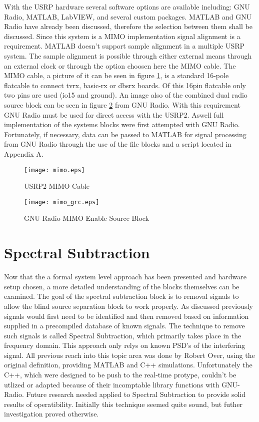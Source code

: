 With the USRP hardware several software options are available including: GNU Radio, MATLAB, LabVIEW, and several custom packages.  MATLAB and GNU Radio have already been discussed, therefore the selection between them shall be discussed.  Since this system is a MIMO implementation signal alignment is a requirement.  MATLAB doesn't support sample alignment in a multiple USRP system.  The sample alignment is possible through either external means through an external clock or through the option choosen here the MIMO cable.  The MIMO cable, a picture of it can be seen in figure \ref{mimo}, is a standard 16-pole flatcable to connect tvrx, basic-rx or dbsrx boards.  Of this 16pin flatcable only two pins are used (io15 and ground)\cite{mimo_cable}.  An image also of the combined dual radio source block can be seen in figure \ref{mimo_grc} from GNU Radio.  With this requirement GNU Radio must be used for direct access with the USRP2.  Aswell full implementation of the systems blocks were first attempted with GNU Radio.  Fortunately, if necessary, data can be passed to MATLAB for signal processing from GNU Radio through the use of the file blocks and a script located in Appendix A.\\

\begin{figure}[!ht]\label{mimo}
\centering
\texttt{[image: mimo.eps]}%
\caption{USRP2 MIMO Cable}
\end{figure} 

\begin{figure}[!ht]\label{mimo_grc}
\centering
\texttt{[image: mimo\_grc.eps]}
\caption{GNU-Radio MIMO Enable Source Block}
\end{figure} 


\section{Spectral Subtraction}

Now that the a formal system level approach has been presented and hardware setup chosen, a more detailed understanding of the blocks themselves can be examined.  The goal of the spectral subtraction block is to removal signals to allow the blind source separation block to work properly.  As discussed previously signals would first need to be identified and then removed based on information supplied in a precompiled database of known signals.  The technique to remove such signals is called Spectral Subtraction, which primarily takes place in the frequency domain.  This approach only relys on known PSD's of the interfering signal.  All previous reach into this topic area was done by Robert Over, using the original definition, providing MATLAB and C++ simulations.  Unfortunately the C++, which were designed to be push to the real-time protype, couldn't be utlized or adapted because of their incomptable library functions with GNU-Radio.  Future research needed applied to Spectral Subtraction to provide solid results of operatibility.  Initially this technique seemed quite sound, but futher investigation proved otherwise.\\

